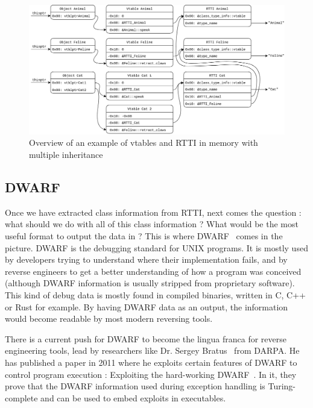 \documentclass[a4paper,11pt,oneside]{report}
\begin{document}
\begin{figure}

\includegraphics[width=16cm]{Feline.png}
\caption{Overview of an example of vtables and RTTI in memory with multiple 
inheritance}
\label{multipleinheritancegraph}

\end{figure}

\subsection{DWARF}
\label{dwarfdesign}

Once we have extracted class information from RTTI, next comes the question :
what should we do with all of this class information ? What would be the most
useful format to output the data in ?
This is where DWARF~\cite{dwarf} comes in the picture. DWARF is the debugging 
standard for UNIX programs.
It is mostly used by developers trying to understand where their implementation 
fails,
and by reverse engineers to get a better understanding of how a program was 
conceived (although DWARF information is usually stripped from proprietary 
software).
This kind of debug data is mostly found in compiled binaries, written in C,
C++ or Rust for example. 
By having DWARF data as an output, the information would become readable by 
most modern reversing tools.

There is a current push for DWARF to become the lingua franca for reverse 
engineering tools, lead by researchers like Dr. Sergey Bratus~\cite{bratus} 
from DARPA.
He has published a paper in 2011 where he exploits certain features of DWARF to
control program execution : Exploiting the hard-working
DWARF~\cite{hardworkingdwarf}.
In it, they prove that the DWARF information used during exception handling
is Turing-complete and can be used to embed exploits in executables.
\end{document}
